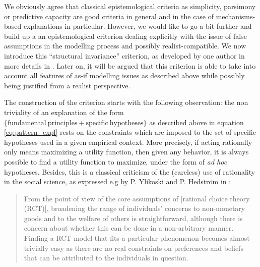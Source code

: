 \documentclass[a4paper,11pt]{article}
\theoremstyle{definition}
\begin{document}
We obviously agree that classical epistemological criteria as simplicity, parsimony or predictive capacity are good criteria in general and in the case of mechanisms-based explanations in particular. However, we would like to go a bit further and build up a an epistemological criterion dealing explicitly with the issue of false assumptions in the modelling process and possibly realist-compatible. We now introduce this ``structural invariance'' criterion, as developed by one author in more details in \citep{attard_rationality}. Later on, it will be argued that this criterion is able to take into account all features of as-if modelling issues as described above while possibly being justified from a realist perspective.

The construction of the criterion starts with the following observation: the non triviality of an explanation of the form $\{\mathrm{fundamental~principles + specific~hypotheses}\}$ as described above in equation \eqref{eq:pattern_expl} rests on the constraints which are imposed to the set of specific hypotheses used in a given empirical context. More precisely, if acting rationally only means maximizing a utility function, then given any behavior, it is always possible to find a utility function to maximize, under the form of \textit{ad hoc} hypotheses. Besides, this is a classical criticism of the (careless) use of rationality in the social science, as expressed e.g by P. Ylikoski and P. Hedström in \citep[Chapter~2,~pp.~59-60]{Manzo2014}:

\begin{quote}
From the point of view of the core assumptions of [rational choice theory (RCT)], broadening the range of individuals’ concerns to non-monetary goods and to the welfare of others is straightforward, although there is concern about whether this can be done in a non-arbitrary manner. \textelp{} Finding a RCT model that fits a particular phenomenon becomes almost trivially easy as there are no real constraints on preferences and beliefs that can be attributed to the individuals in question.
\end{quote}
\end{document}
